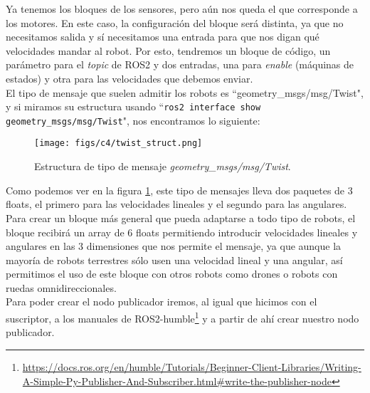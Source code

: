 Ya tenemos los bloques de los sensores, pero aún nos queda el que corresponde a los motores.
En este caso, la configuración del bloque será distinta, ya que no necesitamos salida y sí necesitamos una entrada para que nos
digan qué velocidades mandar al robot. Por esto, tendremos un bloque de código, un parámetro para el \textit{topic} de ROS2 y dos
entradas, una para \textit{enable} (máquinas de estados) y otra para las velocidades que debemos enviar.\\

\newpage
El tipo de mensaje que suelen admitir los robots es ``geometry\_msgs/msg/Twist", y si miramos su estructura usando ``\lstinline|ros2 interface show geometry_msgs/msg/Twist|",
nos encontramos lo siguiente:
\begin{figure} [H]
  \begin{center}
      \texttt{[image: figs/c4/twist\_struct.png]}
  \end{center}
  \caption[Estructura mensaje Twist]{Estructura de tipo de mensaje \textit{geometry\_msgs/msg/Twist}.}
  \label{fig:twist_struct}
\end{figure}

Como podemos ver en la figura \ref{fig:twist_struct}, este tipo de mensajes lleva dos paquetes de 3 floats, el primero para las velocidades
lineales y el segundo para las angulares. Para crear un bloque más general que pueda adaptarse a todo tipo de robots, el bloque recibirá un array
de 6 floats permitiendo introducir velocidades lineales y angulares en las 3 dimensiones que nos permite el mensaje, ya que aunque la mayoría de
robots terrestres sólo usen una velocidad lineal y una angular, así permitimos el uso de este bloque con otros robots como drones o robots con ruedas
omnidireccionales.\\

Para poder crear el nodo publicador iremos, al igual que hicimos con el suscriptor, a los manuales de
ROS2-humble\footnote{\url{https://docs.ros.org/en/humble/Tutorials/Beginner-Client-Libraries/Writing-A-Simple-Py-Publisher-And-Subscriber.html\#write-the-publisher-node}} y
a partir de ahí crear nuestro nodo publicador.













